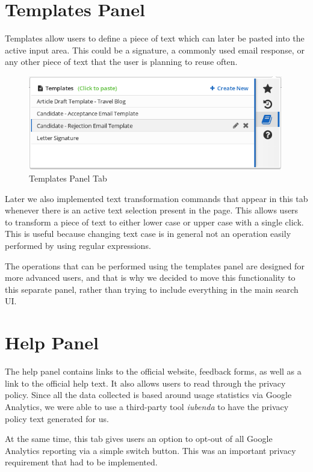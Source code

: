 \documentclass[bsc,frontabs,twoside,singlespacing,parskip,deptreport]{infthesis}
\begin{document}
\section{Templates Panel}
Templates allow users to define a piece of text which can later be pasted into the active input area. This could be a signature, a commonly used email response, or any other piece of text that the user is planning to reuse often.

\begin{figure}[h]
\centering
\includegraphics[width=0.99\textwidth]{../main/images/help/templates.png}
\caption{Templates Panel Tab}
\end{figure}

Later we also implemented text transformation commands that appear in this tab whenever there is an active text selection present in the page. This allows users to transform a piece of text to either lower case or upper case with a single click. This is useful because changing text case is in general not an operation easily performed by using regular expressions.

The operations that can be performed using the templates panel are designed for more advanced users, and that is why we decided to move this functionality to this separate panel, rather than trying to include everything in the main search UI.

\section{Help Panel}
The help panel contains links to the official website, feedback forms, as well as a link to the official help text. It also allows users to read through the privacy policy. Since all the data collected is based around usage statistics via Google Analytics, we were able to use a third-party tool \textit{iubenda} \cite{A25} to have the privacy policy text generated for us.

At the same time, this tab gives users an option to opt-out of all Google Analytics reporting via a simple switch button. This was an important privacy requirement that had to be implemented.
\end{document}
